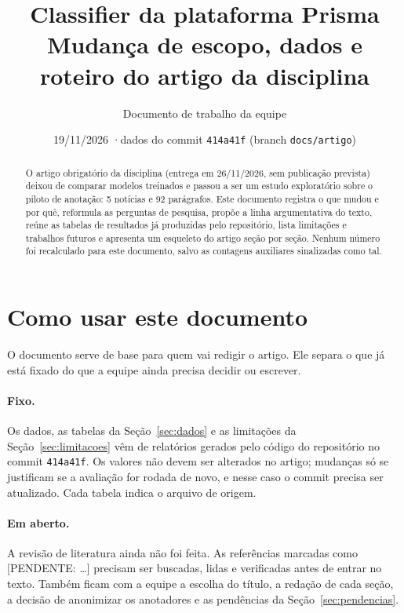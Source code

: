 \documentclass[11pt,a4paper]{article}
\title{Classifier da plataforma Prisma\\[4pt]
\large Mudança de escopo, dados e roteiro do artigo da disciplina}
\author{Documento de trabalho da equipe}
\date{19/11/2026 \quad·\quad dados do commit \texttt{414a41f} (branch \texttt{docs/artigo})}
\newcommand{\pend}[1]{\textcolor{red!60!black}{[PENDENTE: #1]}}
\begin{document}
\maketitle

\begin{abstract}
\noindent O artigo obrigatório da disciplina (entrega em 26/11/2026, sem publicação prevista) deixou de comparar modelos treinados e passou a ser um estudo exploratório sobre o piloto de anotação: 5 notícias e 92 parágrafos. Este documento registra o que mudou e por quê, reformula as perguntas de pesquisa, propõe a linha argumentativa do texto, reúne as tabelas de resultados já produzidas pelo repositório, lista limitações e trabalhos futuros e apresenta um esqueleto do artigo seção por seção. Nenhum número foi recalculado para este documento, salvo as contagens auxiliares sinalizadas como tal.
\end{abstract}

\tableofcontents

\section{Como usar este documento}

O documento serve de base para quem vai redigir o artigo. Ele separa o que já está fixado do que a equipe ainda precisa decidir ou escrever.

\paragraph{Fixo.} Os dados, as tabelas da Seção~\ref{sec:dados} e as limitações da Seção~\ref{sec:limitacoes} vêm de relatórios gerados pelo código do repositório no commit \texttt{414a41f}. Os valores não devem ser alterados no artigo; mudanças só se justificam se a avaliação for rodada de novo, e nesse caso o commit precisa ser atualizado. Cada tabela indica o arquivo de origem.

\paragraph{Em aberto.} A revisão de literatura ainda não foi feita. As referências marcadas como \pend{\ldots} precisam ser buscadas, lidas e verificadas antes de entrar no texto. Também ficam com a equipe a escolha do título, a redação de cada seção, a decisão de anonimizar os anotadores e as pendências da Seção~\ref{sec:pendencias}.
\end{document}
